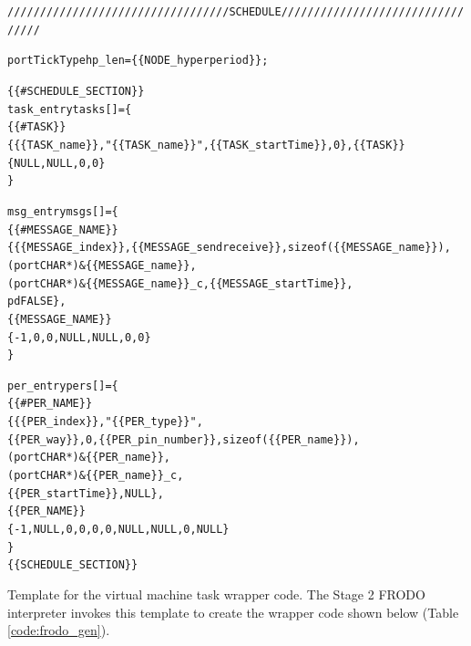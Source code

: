 

\begin{table}
\centering
\begin{alltt}
\scriptsize
////////////////////////////////// SCHEDULE /////////////////////////////////

portTickType hp_len = \{\{NODE_hyperperiod\}\};

\{\{\#SCHEDULE_SECTION\}\}
task\_entry tasks[] = \{
\{\{\#TASK\}\}
   \{ \{\{TASK_name\}\}, "\{\{TASK_name\}\}", \{\{TASK\_startTime\}\}, 0\},\{\{\/TASK\}\}
   \{NULL, NULL, 0, 0\}
\}\;

msg\_entry msgs[] = \{
\{\{\#MESSAGE\_NAME\}\}
   \{ \{\{MESSAGE\_index\}\}, \{\{MESSAGE\_sendreceive\}\}, sizeof( \{\{MESSAGE\_name\}\} ), 
         (portCHAR *) \& \{\{MESSAGE\_name\}\}, 
         (portCHAR *) \& \{\{MESSAGE\_name\}\}\_c, \{\{MESSAGE\_startTime\}\}, 
         pdFALSE\},
\{\{\/MESSAGE\_NAME\}\}
   \{ -1, 0, 0, NULL, NULL, 0, 0\}
\}\;

per\_entry pers[] = \{
\{\{\#PER_NAME\}\}
   \{ \{\{PER\_index\}\}, "\{\{PER\_type\}\}", 
         \{\{PER\_way\}\}, 0, \{\{PER\_pin\_number\}\}, sizeof( \{\{PER\_name\}\} ), 
         (portCHAR *) \& \{\{PER\_name\}\}, 
         (portCHAR *) \& \{\{PER\_name\}\}\_c, 
         \{\{PER\_startTime\}\}, NULL\}, 
\{\{\/PER_NAME\}\}
   \{ -1, NULL, 0, 0, 0, 0, NULL, NULL, 0, NULL \}
\}\;
\{\{\/SCHEDULE_SECTION\}\}

\end{alltt}
\caption{Template for the virtual machine task wrapper code. The Stage 2 FRODO interpreter invokes
this template to create the wrapper code shown below (Table \ref{code:frodo_gen}).}
\label{code:frodo_templ}
\end{table}

